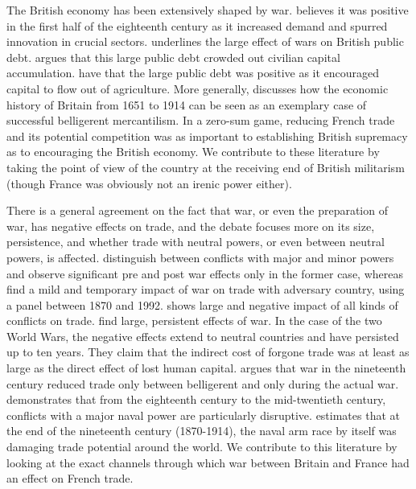 \documentclass[12pt,a4paper,notitlepage,english]{article}
\begin{document}
The British economy has been extensively shaped by war.
\cite{John1955} believes it was positive in the first half of the eighteenth century as it increased demand and spurred innovation in crucial sectors.
\cite{Eloranta2011} underlines the large effect of wars on British public debt.
\cite{Williamson1984} argues that this large public debt crowded out civilian capital accumulation.
\cite{Ventura2015} have that the large public debt was positive as it encouraged capital to flow out of agriculture.
More generally, \cite{OBrien2018} discusses how the economic history of Britain from 1651 to 1914 can be seen as an exemplary case of successful belligerent mercantilism.
In a zero-sum game, reducing French trade and its potential competition was as important to establishing British supremacy as to encouraging the British economy.
We contribute to these literature by taking the point of view of the country at the receiving end of British militarism (though France was obviously not an irenic power either).

There is a general agreement on the fact that war, or even the preparation of war, has negative effects on trade, and the debate focuses more on its size, persistence, and whether trade with neutral powers, or even between neutral powers, is affected.
\cite{Anderton2001} distinguish between conflicts with major and minor powers and observe significant pre and post war effects only in the former case, whereas \cite{Levy2004} find a mild and temporary impact of war on trade with adversary country, using a panel between 1870 and 1992.
\cite{Blomberg2006} shows large and negative impact of all kinds of conflicts on trade. 
\cite{Glick2010} find large, persistent effects of war.
In the case of the two World Wars, the negative effects extend to neutral countries and have persisted up to ten years.  
They claim that the indirect cost of forgone trade was at least as large as the direct effect of lost human capital.
\cite{Karlsson2021} argues that war in the nineteenth century reduced trade only between belligerent and only during the actual war.
\cite{Rahman2010} demonstrates that from the eighteenth century to the mid-twentieth century, conflicts with a major naval power are particularly disruptive.
\cite{Glaser2016} estimates that at the end of the nineteenth century (1870-1914), the naval arm race by itself was damaging trade potential around the world.
We contribute to this literature by looking at the exact channels through which war between Britain and France had an effect on French trade.
\end{document}
